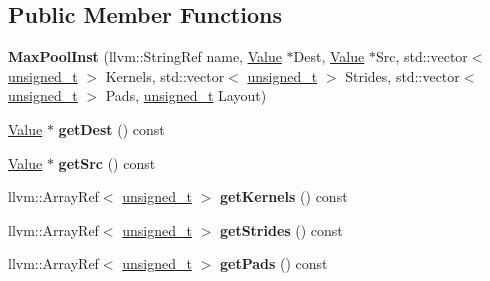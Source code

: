 \subsection*{Public Member Functions}
\begin{DoxyCompactItemize}
\item 
\mbox{\label{classglow_1_1_max_pool_inst_a38b50b27dc27af0bc56e642f74085d2d}} 
{\bfseries Max\+Pool\+Inst} (llvm\+::\+String\+Ref name, \hyperlink{classglow_1_1_value}{Value} $\ast$Dest, \hyperlink{classglow_1_1_value}{Value} $\ast$Src, std\+::vector$<$ \hyperlink{namespaceglow_a0ca574644e1e42ef193a9947fb4d8911}{unsigned\+\_\+t} $>$ Kernels, std\+::vector$<$ \hyperlink{namespaceglow_a0ca574644e1e42ef193a9947fb4d8911}{unsigned\+\_\+t} $>$ Strides, std\+::vector$<$ \hyperlink{namespaceglow_a0ca574644e1e42ef193a9947fb4d8911}{unsigned\+\_\+t} $>$ Pads, \hyperlink{namespaceglow_a0ca574644e1e42ef193a9947fb4d8911}{unsigned\+\_\+t} Layout)
\item 
\mbox{\label{classglow_1_1_max_pool_inst_a9a8cdf714ad169dc79cda5f3c8ef8ac4}} 
\hyperlink{classglow_1_1_value}{Value} $\ast$ {\bfseries get\+Dest} () const
\item 
\mbox{\label{classglow_1_1_max_pool_inst_a159647fee8ac30ea4e11620afa0b90dc}} 
\hyperlink{classglow_1_1_value}{Value} $\ast$ {\bfseries get\+Src} () const
\item 
\mbox{\label{classglow_1_1_max_pool_inst_a0f4b806067a3552cec5bf4e18fdc17a2}} 
llvm\+::\+Array\+Ref$<$ \hyperlink{namespaceglow_a0ca574644e1e42ef193a9947fb4d8911}{unsigned\+\_\+t} $>$ {\bfseries get\+Kernels} () const
\item 
\mbox{\label{classglow_1_1_max_pool_inst_a8d0276e52120a412d87022c4e4671115}} 
llvm\+::\+Array\+Ref$<$ \hyperlink{namespaceglow_a0ca574644e1e42ef193a9947fb4d8911}{unsigned\+\_\+t} $>$ {\bfseries get\+Strides} () const
\item 
\mbox{\label{classglow_1_1_max_pool_inst_aab5558e269781cc7e8576c30dbde1a6a}} 
llvm\+::\+Array\+Ref$<$ \hyperlink{namespaceglow_a0ca574644e1e42ef193a9947fb4d8911}{unsigned\+\_\+t} $>$ {\bfseries get\+Pads} () const
\item 

\end{DoxyCompactItemize}

